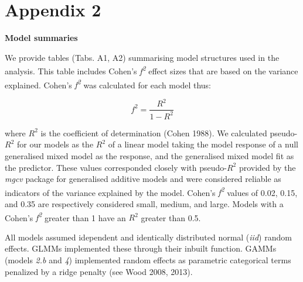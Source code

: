 \documentclass[10pt,twocolumn]{paper}
\begin{document}
\clearpage

\section{Appendix 2}\label{appendix-2}

\textbf{Model summaries}

We provide tables (Tabs. A1, A2) summarising model structures used in
the analysis. This table includes Cohen's \emph{f\textsuperscript{2}}
effect sizes that are based on the variance explained. Cohen's
\emph{f\textsuperscript{2}} was calculated for each model thus:

\begin{equation} f^2 =  \frac{R^2}{1 - R^2} \end{equation}

where \(R^2\) is the coefficient of determination (Cohen 1988). We
calculated pseudo-\(R^2\) for our models as the \(R^2\) of a linear
model taking the model response of a null generalised mixed model as the
response, and the generalised mixed model fit as the predictor. These
values corresponded closely with pseudo-\(R^2\) provided by the
\emph{mgcv} package for generalised additive models and were considered
reliable as indicators of the variance explained by the model. Cohen's
\emph{f\textsuperscript{2}} values of 0.02, 0.15, and 0.35 are
respectively considered small, medium, and large. Models with a Cohen's
\emph{f\textsuperscript{2}} greater than 1 have an \(R^2\) greater than
0.5.

All models assumed idependent and identically distributed normal
(\emph{iid}) random effects. GLMMs implemented these through their
inbuilt function. GAMMs (models \emph{2.b} and \emph{4}) implemented
random effects as parametric categorical terms penalized by a ridge
penalty (see Wood 2008, 2013).
\end{document}
